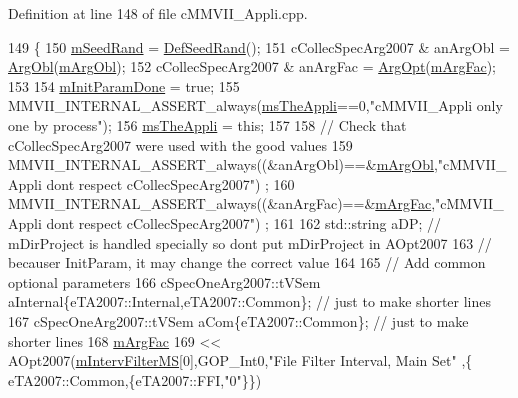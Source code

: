 Definition at line 148 of file c\+M\+M\+V\+I\+I\+\_\+\+Appli.\+cpp.


\begin{DoxyCode}
149 \{
150   \hyperlink{classMMVII_1_1cMMVII__Appli_a52b203a011f0a75f962d690fa45e3803}{mSeedRand} = \hyperlink{classMMVII_1_1cMMVII__Appli_ae730fa87b2c7ef3a325f935eb5de7b73}{DefSeedRand}();
151   cCollecSpecArg2007 & anArgObl = \hyperlink{classMMVII_1_1cMMVII__Appli_a1ef6d49e115140e2f1e4960a70171c65}{ArgObl}(\hyperlink{classMMVII_1_1cMMVII__Appli_a86f7322447bc62804d397f01b9e346c7}{mArgObl});
152   cCollecSpecArg2007 & anArgFac = \hyperlink{classMMVII_1_1cMMVII__Appli_ab7a91471c89643421bc3c049a2ce4213}{ArgOpt}(\hyperlink{classMMVII_1_1cMMVII__Appli_a18ca3cf743bc5d1c3f9250d0302fe25f}{mArgFac});
153 
154   \hyperlink{classMMVII_1_1cMMVII__Appli_aec64e7bc2232cdb0488137b178eb104c}{mInitParamDone} = \textcolor{keyword}{true};
155   MMVII\_INTERNAL\_ASSERT\_always(\hyperlink{classMMVII_1_1cMMVII__Appli_ad2cee4f236229daed712c7d4353ee28f}{msTheAppli}==0,\textcolor{stringliteral}{"cMMVII\_Appli only one by process"});
156   \hyperlink{classMMVII_1_1cMMVII__Appli_ad2cee4f236229daed712c7d4353ee28f}{msTheAppli} = \textcolor{keyword}{this};
157 
158   \textcolor{comment}{// Check that  cCollecSpecArg2007 were used with the good values}
159   MMVII\_INTERNAL\_ASSERT\_always((&anArgObl)==&\hyperlink{classMMVII_1_1cMMVII__Appli_a86f7322447bc62804d397f01b9e346c7}{mArgObl},\textcolor{stringliteral}{"cMMVII\_Appli dont respect cCollecSpecArg2007"})
      ;
160   MMVII\_INTERNAL\_ASSERT\_always((&anArgFac)==&\hyperlink{classMMVII_1_1cMMVII__Appli_a18ca3cf743bc5d1c3f9250d0302fe25f}{mArgFac},\textcolor{stringliteral}{"cMMVII\_Appli dont respect cCollecSpecArg2007"})
      ;
161 
162   std::string aDP; \textcolor{comment}{// mDirProject is handled specially so dont put mDirProject in AOpt2007}
163                    \textcolor{comment}{// becauser  InitParam, it may change the correct value }
164 
165   \textcolor{comment}{// Add common optional parameters}
166   cSpecOneArg2007::tVSem aInternal\{eTA2007::Internal,eTA2007::Common\}; \textcolor{comment}{// just to make shorter lines}
167   cSpecOneArg2007::tVSem aCom\{eTA2007::Common\}; \textcolor{comment}{// just to make shorter lines}
168   \hyperlink{classMMVII_1_1cMMVII__Appli_a18ca3cf743bc5d1c3f9250d0302fe25f}{mArgFac}
169       <<  AOpt2007(\hyperlink{classMMVII_1_1cMMVII__Appli_ac3534cd89df89a254e1b58934c79b328}{mIntervFilterMS}[0],GOP\_Int0,\textcolor{stringliteral}{"File Filter Interval, Main Set"}  ,\{
      eTA2007::Common,\{eTA2007::FFI,\textcolor{stringliteral}{"0"}\}\})

\end{DoxyCode}

